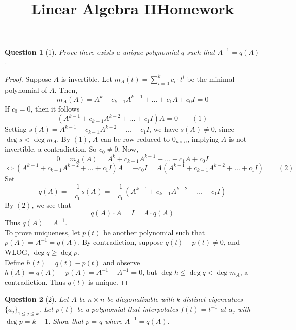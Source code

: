 \documentclass[11pt]{article}
\title{\vspace{-50pt}
\Huge \name
\\\vspace{20pt}
\huge Linear Algebra II\hfill Homework \hw}
\author{}
\date{}
\theoremstyle{quest}
\newtheorem*{question}{Question}
\begin{document}
\maketitle

\begin{question}[1]
Prove there exists a unique polynomial $q$ such that $A^{-1} = q(A)$.
\end{question}
\begin{proof}
Suppose $A$ is invertible. Let $m_A(t) = \sum_{i = 0}^k c_i \cdot t^i$ be the minimal polynomial of $A$. Then,
$$m_A(A) = A^k + c_{k-1} A^{k-1} + \ldots + c_1 A + c_0 I = 0$$
If $c_0 = 0$, then it follows
$$(A^{k-1} + c_{k-1}A^{k-2} + \ldots + c_1 I)A = 0\ \ \ \ \ \ \ \ \ (1)$$
Setting $s(A) = A^{k-1} + c_{k-1}A^{k-2} + \ldots + c_1 I$, we have $s(A) \ne 0$, since $\deg s < \deg m_A$. By $(1)$, $A$ can be row-reduced to $0_{n \times n}$, implying $A$ is not invertible, a contradiction. So $c_0 \ne 0$. Now,
$$0 = m_A(A) = A^k + c_{k-1} A^{k-1} + \ldots + c_1 A + c_0 I $$
$$\iff (A^{k-1} + c_{k-1}A^{k-2} + \ldots + c_1 I)A = -c_0 I = A(A^{k-1} + c_{k-1}A^{k-2} + \ldots + c_1 I)\ \ \ \ \ \ \ \ \ (2)$$
Set $$q(A) = -\frac{1}{c_0} s(A) = -\frac{1}{c_0} (A^{k-1} + c_{k-1}A^{k-2} + \ldots + c_1 I)$$
By $(2)$, we see that
$$q(A) \cdot A = I = A \cdot q(A)$$
Thus $q(A) = A^{-1}$.\\
To prove uniqueness, let $p(t)$ be another polynomial such that $p(A) = A^{-1} = q(A)$. By contradiction, suppose $q(t) - p(t) \ne 0$, and WLOG, $\deg q \ge \deg p$. \\Define $h(t) = q(t) - p(t)$ and observe $h(A) = q(A) - p(A) = A^{-1} - A^{-1} = 0$, but $\deg h \le \deg q < \deg m_A$, a contradiction. Thus $q(t)$ is unique.
\end{proof}
\begin{question}[2]
Let $A$ be $n \times n$ be diagonalizable with $k$ distinct eigenvalues $\{a_j\}_{1 \le j \le k}$. Let $p(t)$ be a polynomial that interpolates $f(t) = t^{-1}$ at $a_j$ with $\deg p = k-1$. Show that $p = q$ where $A^{-1} = q(A)$.
\end{question}
\end{document}
